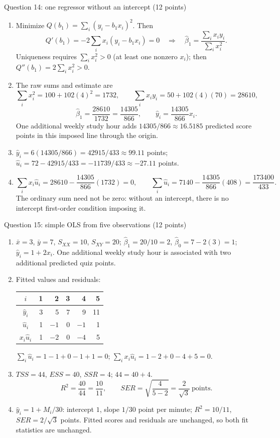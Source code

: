 \documentclass[a4paper,11pt,twoside]{article}
\newcommand{\heading}[1]{\par\medskip\noindent #1\par\nobreak\smallskip}
\begin{document}
\heading{Question 14: one regressor without an intercept (12 points)}
\begin{enumerate}[label=(\alph*),leftmargin=*,itemsep=3pt,topsep=2pt]
\item Minimize $Q(b_1)=\sum_i(y_i-b_1x_i)^2$. Then
\[
Q'(b_1)=-2\sum_i x_i(y_i-b_1x_i)=0
\quad\Longrightarrow\quad
\widehat\beta_1=\frac{\sum_i x_i y_i}{\sum_i x_i^2}.
\]
Uniqueness requires $\sum_i x_i^2>0$ (at least one nonzero $x_i$);
then $Q''(b_1)=2\sum_i x_i^2>0$.
\item The raw sums and estimate are
\[
\sum_i x_i^2=100+102(4)^2=1732,\qquad
\sum_i x_i y_i=50+102(4)(70)=28610,
\]
\[
\widehat\beta_1=\frac{28610}{1732}=\frac{14305}{866},
\qquad \widehat y_i=\frac{14305}{866}x_i.
\]
One additional weekly study hour adds $14305/866\approx16.5185$ predicted
score points in this imposed line through the origin.
\item $\widehat y_i=6(14305/866)=42915/433\approx99.11$ points;
$\widehat u_i=72-42915/433=-11739/433\approx-27.11$ points.
\item
\[
\sum_i x_i\widehat u_i=28610-\frac{14305}{866}(1732)=0,
\qquad
\sum_i\widehat u_i=7140-\frac{14305}{866}(408)=\frac{173400}{433}.
\]
The ordinary sum need not be zero: without an intercept, there is no
intercept first-order condition imposing it.
\end{enumerate}

\heading{Question 15: simple OLS from five observations (12 points)}
\begin{enumerate}[label=(\alph*),leftmargin=*,itemsep=3pt,topsep=2pt]
\item $\bar x=3$, $\bar y=7$, $S_{XX}=10$, $S_{XY}=20$;
$\widehat\beta_1=20/10=2$, $\widehat\beta_0=7-2(3)=1$;
$\widehat y_i=1+2x_i$. One additional weekly study hour is associated with
two additional predicted quiz points.
\item Fitted values and residuals:
\begin{center}
\begin{tabular}{c|rrrrr}
$i$ & 1 & 2 & 3 & 4 & 5 \\ \hline
$\widehat y_i$ & 3 & 5 & 7 & 9 & 11 \\
$\widehat u_i$ & 1 & $-1$ & 0 & $-1$ & 1 \\
$x_i\widehat u_i$ & 1 & $-2$ & 0 & $-4$ & 5
\end{tabular}
\end{center}
$\sum_i\widehat u_i=1-1+0-1+1=0$;
$\sum_i x_i\widehat u_i=1-2+0-4+5=0$.
\item $TSS=44$, $ESS=40$, $SSR=4$; $44=40+4$.
\[
R^2=\frac{40}{44}=\frac{10}{11},\qquad
SER=\sqrt{\frac4{5-2}}=\frac2{\sqrt3}\ \text{points}.
\]
\item $\widehat y_i=1+M_i/30$: intercept $1$, slope $1/30$ point per minute;
$R^2=10/11$, $SER=2/\sqrt3$ points. Fitted scores and residuals are unchanged,
so both fit statistics are unchanged.
\end{enumerate}
\end{document}
